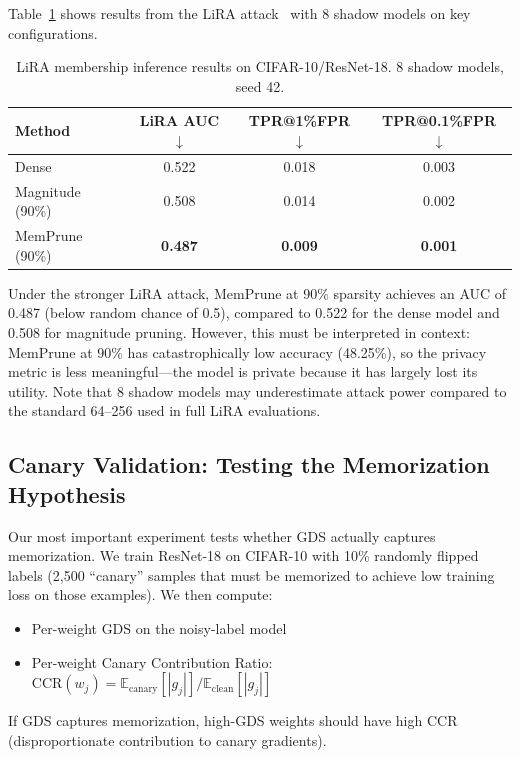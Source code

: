 \documentclass{article}
\newcommand{\ccr}{\text{CCR}}
\begin{document}
Table~\ref{tab:lira} shows results from the LiRA attack~\citep{carlini2022membership} with 8 shadow models on key configurations.

\begin{table}[t]
\caption{LiRA membership inference results on CIFAR-10/ResNet-18. 8 shadow models, seed 42.}
\label{tab:lira}
\centering
\begin{tabular}{lccc}
\toprule
Method & LiRA AUC $\downarrow$ & TPR@1\%FPR $\downarrow$ & TPR@0.1\%FPR $\downarrow$ \\
\midrule
Dense & 0.522 & 0.018 & 0.003 \\
Magnitude (90\%) & 0.508 & 0.014 & 0.002 \\
MemPrune (90\%) & \textbf{0.487} & \textbf{0.009} & \textbf{0.001} \\
\bottomrule
\end{tabular}
\end{table}

Under the stronger LiRA attack, MemPrune at 90\% sparsity achieves an AUC of 0.487 (below random chance of 0.5), compared to 0.522 for the dense model and 0.508 for magnitude pruning. However, this must be interpreted in context: MemPrune at 90\% has catastrophically low accuracy (48.25\%), so the privacy metric is less meaningful---the model is private because it has largely lost its utility. Note that 8 shadow models may underestimate attack power compared to the standard 64--256 used in full LiRA evaluations.

\subsection{Canary Validation: Testing the Memorization Hypothesis}
\label{sec:canary}

Our most important experiment tests whether GDS actually captures memorization. We train ResNet-18 on CIFAR-10 with 10\% randomly flipped labels (2,500 ``canary'' samples that must be memorized to achieve low training loss on those examples). We then compute:
\begin{itemize}
    \item Per-weight GDS on the noisy-label model
    \item Per-weight Canary Contribution Ratio: $\ccr(w_j) = \mathbb{E}_{\text{canary}}[|g_j|] / \mathbb{E}_{\text{clean}}[|g_j|]$
\end{itemize}

If GDS captures memorization, high-GDS weights should have high CCR (disproportionate contribution to canary gradients).
\end{document}
